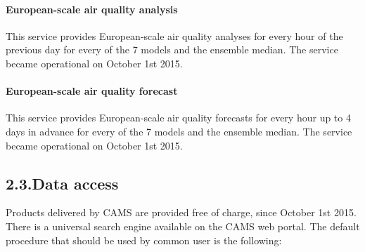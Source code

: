 \documentclass[9pt]{report}
\begin{document}
\paragraph{European-scale air quality analysis}\label{sec-european-scale-air-quality-analysis}%

\noindent{}\mdbr
{}This service provides European-scale air quality analyses for every hour of the previous day for every of the 7 models and the ensemble median. 
The service became operational on October 1st 2015.%

\paragraph{European-scale air quality forecast}\label{sec-european-scale-air-quality-forecast}%

\noindent{}\mdbr
{}This service provides European-scale air quality forecasts for every hour up to 4 days in advance for every of the 7 models and the ensemble median. 
The service became operational on October 1st 2015.%

\subsection{2.3.\hspace*{0.5em}Data access}\label{sec-data-access}%

\noindent{}Products delivered by CAMS are provided free of charge, since October 1st 2015.
There is a universal search engine available on the CAMS web portal. 
The default procedure that should be used by common user is the following:%
\end{document}
